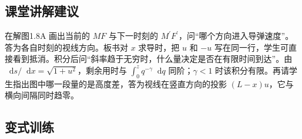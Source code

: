 \documentclass[UTF8,fontset=fandol,a4paper,11pt]{ctexart}
\newcommand{\dd}{\mathop{}\!\mathrm{d}}
\begin{document}


\subsection*{课堂讲解建议}

在解图1.8A 画出当前的 $MF$ 与下一时刻的 $M^{\prime}F^{\prime}$，问“哪个方向进入导弹速度”。答为各自时刻的视线方向。板书对 $x$ 求导时，把 $u$ 和 $-u$ 写在同一行，学生可直接看到抵消。积分后问“斜率趋于无穷时，什么量决定是否在有限时间到达”。由 $\dd s/\dd x=\sqrt{1+u^2}$，剩余用时与 $\int_0^z q^{-\gamma}\dd q$ 同阶；$\gamma<1$ 时该积分有限。再请学生指出图中哪一段量的是高度差，答为视线在竖直方向的投影 $(L-x)u$，它与横向间隔同时趋零。



\subsection*{变式训练}
\end{document}
